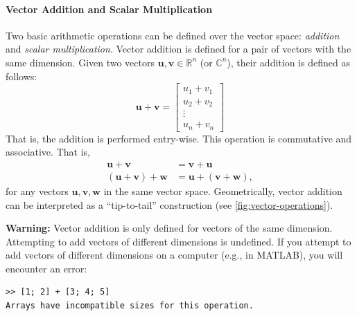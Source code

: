 \paragraph*{Vector Addition and Scalar Multiplication}
Two basic arithmetic operations can be defined over the vector space: \emph{addition} and \emph{scalar multiplication}.
Vector addition is defined for a pair of vectors with the same dimension.
Given two vectors $ \mathbf{u}, \mathbf{v} \in \mathbb{R}^n $ (or $ \mathbb{C}^n $), their addition is defined as follows:
\begin{equation*}
  \mathbf{u} + \mathbf{v} = \begin{bmatrix} u_1 + v_1 \\ u_2 + v_2 \\ \vdots \\ u_n + v_n \end{bmatrix}
\end{equation*}
That is, the addition is performed entry-wise.
This operation is commutative and associative. That is,
\begin{align*}
  \mathbf{u} + \mathbf{v} &= \mathbf{v} + \mathbf{u} \\
  (\mathbf{u} + \mathbf{v}) + \mathbf{w} &= \mathbf{u} + (\mathbf{v} + \mathbf{w}),
\end{align*}
for any vectors $ \mathbf{u}, \mathbf{v}, \mathbf{w} $ in the same vector space.
Geometrically, vector addition can be interpreted as a ``tip-to-tail'' construction (see \autoref{fig:vector-operations}).

\begin{warningBox}
  \textbf{Warning:} Vector addition is only defined for vectors of the same dimension. Attempting to add vectors of different dimensions is undefined. If you attempt to add vectors of different dimensions on a computer (e.g., in MATLAB), you will encounter an error:
\begin{verbatim}
>> [1; 2] + [3; 4; 5]
Arrays have incompatible sizes for this operation.
\end{verbatim}
\end{warningBox}

